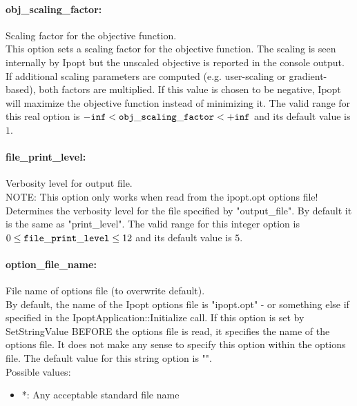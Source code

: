 \paragraph{obj\_scaling\_factor:}\label{sec:obj_scaling_factor} Scaling factor for the objective function. $\;$ \\
 This option sets a scaling factor for the
objective function. The scaling is seen
internally by Ipopt but the unscaled objective is
reported in the console output. If additional
scaling parameters are computed (e.g.
user-scaling or gradient-based), both factors are
multiplied. If this value is chosen to be
negative, Ipopt will maximize the objective
function instead of minimizing it. The valid range for this real option is 
${\tt -inf} <  {\tt obj\_scaling\_factor } <  {\tt +inf}$
and its default value is $1$.


\paragraph{file\_print\_level:}\label{sec:file_print_level} Verbosity level for output file. $\;$ \\
 NOTE: This option only works when read from the
ipopt.opt options file! Determines the verbosity
level for the file specified by "output\_file". 
By default it is the same as "print\_level". The valid range for this integer option is
$0 \le {\tt file\_print\_level } \le 12$
and its default value is $5$.


\paragraph{option\_file\_name:}\label{sec:option_file_name} File name of options file (to overwrite default). $\;$ \\
 By default, the name of the Ipopt options file is
"ipopt.opt" - or something else if specified in
the IpoptApplication::Initialize call. If this
option is set by SetStringValue BEFORE the
options file is read, it specifies the name of
the options file.  It does not make any sense to
specify this option within the options file.
The default value for this string option is "".
\\ 
Possible values:
\begin{itemize}
   \item *: Any acceptable standard file name
\end{itemize}

